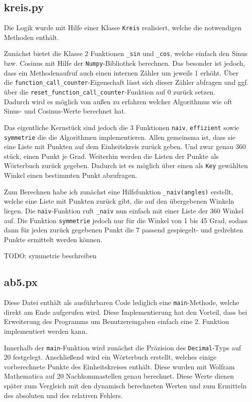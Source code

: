 \documentclass{scrartcl}
\begin{document}
	\subsection{kreis.py}
	
	Die Logik wurde mit Hilfe einer Klasse \verb|Kreis| realisiert, welche die notwendigen Methoden enthält.
	
	Zunächst bietet die Klasse 2 Funktionen \verb|_sin| und \verb|_cos|, welche einfach den Sinus bzw. Cosinus mit Hilfe der \verb|Numpy|-Bibliothek berechnen. Das besonder ist jedoch, dass ein Methodenaufruf auch einen internen Zähler um jeweils 1 erhöht. Über die \verb|function_call_counter|-Eigenschaft lässt sich dieser Zähler abfragen und ggf. über die \verb|reset_function_call_counter|-Funktion auf 0 zurück setzen. \\
	Dadurch wird es möglich von außen zu erfahren welcher Algorithmus wie oft Sinus- und Cosinus-Werte berechnet hat.
	
	Das eigentliche Kernstück sind jedoch die 3 Funktionen \verb|naiv|, \verb|effizient| sowie \verb|symmetrie| die die Algorithmen implementieren. Allen gemeinsma ist, dass sie eine Liste mit Punkten auf dem Einheitskreis zurück geben. Und zwar genau 360 stück, einen Punkt je Grad. Weiterhin werden die Listen der Punkte als Wörterbuch zurück gegeben. Dadurch ist es möglich über einen als \verb|Key| gewählten Winkel einen bestimmten Punkt abzufragen.
	
	Zum Berechnen habe ich zunächst eine Hilfsfunktion \verb|_naiv(angles)| erstellt, welche eine Liste mit Punkten zurück gibt, die auf den übergebenen Winkeln liegen. Die \verb|naiv|-Funktion ruft \verb|_naiv| nun einfach mit einer Liste der 360 Winkel auf. Die Funktion \verb|symmetrie| jedoch nur für die Winkel von 1 bis 45 Grad, sodass dann für jeden zurück gegebenen Punkt die 7 passend gespiegelt- und gedrehten Punkte ermittelt werden können.
	
	TODO: symmetrie beschreiben
	
	\subsection{ab5.px}
	
	Diese Datei enthält als ausführbaren Code lediglich eine \verb|main|-Methode, welche direkt am Ende aufgerufen wird. Diese Implementierung hat den Vorteil, dass bei Erweiterung des Programms um Benutzereingaben einfach eine 2. Funktion implementiert werden kann.
	
	Innerhalb der \verb|main|-Funktion wird zunächst die Präzision des \verb|Decimal|-Typs auf 20 festgelegt. Anschließend wird ein Wörterbuch erstellt, welches einige vorberechnete Punkte des Einheitskreises enthält. Diese wurden mit Wolfram Mathematica auf 20 Nachkommastellen genau berechnet. Diese Werte dienen später zum Vergleich mit den dynamisch berechneten Werten und zum Ermitteln des absoluten und des relativen Fehlers.
	
\end{document}
